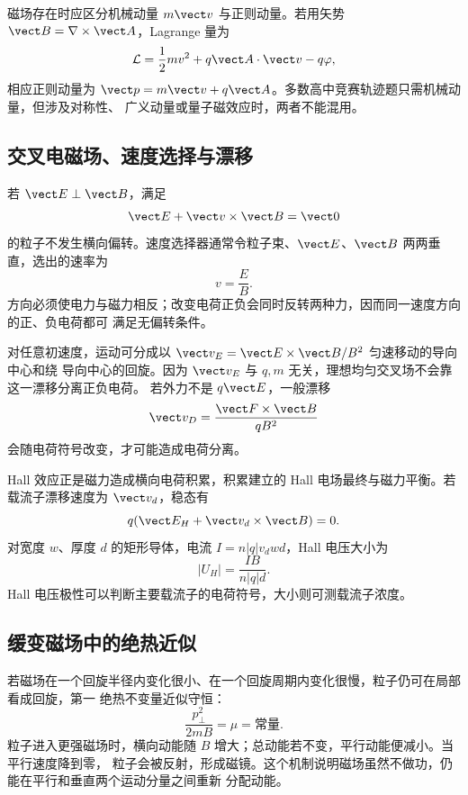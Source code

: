 磁场存在时应区分机械动量 $m\vect v$ 与正则动量。若用矢势
$\vect B=\nabla\times\vect A$，Lagrange 量为
\begin{equation}
 \mathcal L=\frac12mv^2+q\vect A\cdot\vect v-q\varphi,
\end{equation}
相应正则动量为 $\vect p=m\vect v+q\vect A$。多数高中竞赛轨迹题只需机械动量，但涉及对称性、
广义动量或量子磁效应时，两者不能混用。

\subsection*{交叉电磁场、速度选择与漂移}

若 $\vect E\perp\vect B$，满足
\begin{equation}
 \vect E+\vect v\times\vect B=\vect0
\end{equation}
的粒子不发生横向偏转。速度选择器通常令粒子束、$\vect E$、$\vect B$ 两两垂直，选出的速率为
\begin{equation}
 \boxed{v=\frac EB}.
\end{equation}
方向必须使电力与磁力相反；改变电荷正负会同时反转两种力，因而同一速度方向的正、负电荷都可
满足无偏转条件。

对任意初速度，运动可分成以 $\vect v_E=\vect E\times\vect B/B^2$ 匀速移动的导向中心和绕
导向中心的回旋。因为 $\vect v_E$ 与 $q,m$ 无关，理想均匀交叉场不会靠这一漂移分离正负电荷。
若外力不是 $q\vect E$，一般漂移
\begin{equation}
 \vect v_D=\frac{\vect F\times\vect B}{qB^2}
\end{equation}
会随电荷符号改变，才可能造成电荷分离。

Hall 效应正是磁力造成横向电荷积累，积累建立的 Hall 电场最终与磁力平衡。若载流子漂移速度为
$\vect v_d$，稳态有
\begin{equation}
 q(\vect E_H+\vect v_d\times\vect B)=0.
\end{equation}
对宽度 $w$、厚度 $d$ 的矩形导体，电流 $I=n|q|v_dwd$，Hall 电压大小为
\begin{equation}
 \boxed{|U_H|=\frac{IB}{n|q|d}}.
\end{equation}
Hall 电压极性可以判断主要载流子的电荷符号，大小则可测载流子浓度。

\subsection*{缓变磁场中的绝热近似}

若磁场在一个回旋半径内变化很小、在一个回旋周期内变化很慢，粒子仍可在局部看成回旋，第一
绝热不变量近似守恒：
\begin{equation}
 \boxed{\frac{p_\perp^2}{2mB}=\mu=\text{常量}}.
\end{equation}
粒子进入更强磁场时，横向动能随 $B$ 增大；总动能若不变，平行动能便减小。当平行速度降到零，
粒子会被反射，形成磁镜。这个机制说明磁场虽然不做功，仍能在平行和垂直两个运动分量之间重新
分配动能。


